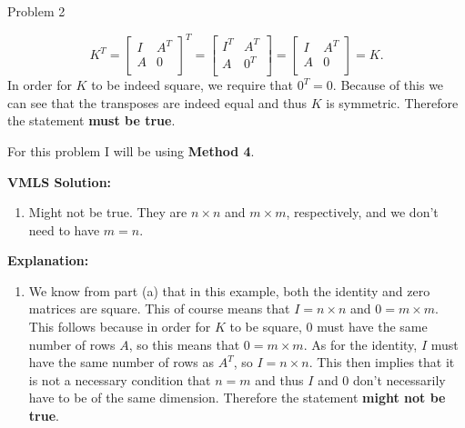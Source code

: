 \begin{problem}{Problem 2}
\begin{highlight}
\begin{enumerate}[label = (\alph*), start = 3]
            \begin{equation}
                K^{T} = 
                \begin{bmatrix}
                    I & A^{T} \\
                    A & 0 \\
                \end{bmatrix}^{T}
                = 
                \begin{bmatrix}
                    I^{T} & A^{T} \\
                    A & 0^{T} \\
                \end{bmatrix}
                = 
                \begin{bmatrix}
                    I & A^{T} \\
                    A & 0 \\
                \end{bmatrix}
                = K.
            \end{equation}
            In order for $K$ to be indeed square, we require that $0^{T} = 0$. Because of this we can see that the transposes are indeed equal and thus $K$ is symmetric. Therefore the statement 
            \textbf{must be true}.
        \end{enumerate}
    \end{highlight}

    \begin{highlight}
        For this problem I will be using \textbf{Method 4}. \vspace*{1em}

        \noindent \textbf{VMLS Solution:}

        \begin{enumerate}[label = (\alph*), start = 4]
            \item Might not be true. They are $n \times n$ and $m \times m$, respectively, and we don’t need to have $m = n$.
        \end{enumerate}

        \noindent \textbf{Explanation:}

        \begin{enumerate}[label = (\alph*), start = 4]
            \item We know from part (a) that in this example, both the identity and zero matrices are square. This of course means that $I = n \times n$ and $0 = m \times m$. This follows because
            in order for $K$ to be square, 0 must have the same number of rows $A$, so this means that $0 = m \times m$. As for the identity, $I$ must have the same number of rows as $A^{T}$, so
            $I = n \times n$. This then implies that it is not a necessary condition that $n = m$ and thus $I$ and 0 don't necessarily have to be of the same dimension. Therefore the statement
            \textbf{might not be true}.
        \end{enumerate}
    \end{highlight}


\end{problem}
